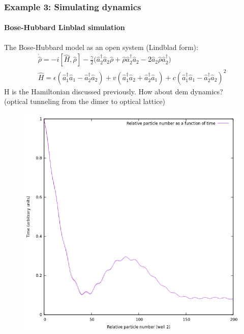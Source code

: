 \documentclass{beamer}
\begin{document}
\begin{frame}
\frametitle{Example 3: Simulating dynamics}
\framesubtitle{Bose-Hubbard Linblad simulation}
The Bose-Hubbard model as an open system (Lindblad form):
\begin{align}
\dot{\hat{\rho}} = -i[\hat{H},\hat{\rho}] - \frac{\gamma}{2}\bigg( \hat{a}_2^\dagger \hat{a}_2 \hat{\rho} + \hat{\rho}\hat{a}_2^\dagger \hat{a}_2-2\hat{a}_2\hat{\rho}\hat{a}_2^\dagger  \bigg)\\
\hat{H} = \epsilon (\hat{a}_1^\dagger \hat{a}_1-\hat{a}_2^\dagger\hat{a}_2) + v (\hat{a}_1^\dagger\hat{a}_2 + \hat{a}_2^\dagger\hat{a}_1) + c(\hat{a}_1^\dagger\hat{a}_1 - \hat{a}_2^\dagger\hat{a}_2)^2
\end{align}
H is the Hamiltonian discussed previously. How about dem dynamics?\\
(optical tunneling from the dimer to optical lattice)
\end{frame}
\begin{frame}
\begin{figure}
\includegraphics[scale=0.55]{bosehubbardlindblad.png}
\end{figure}
\end{frame}
\end{document}
